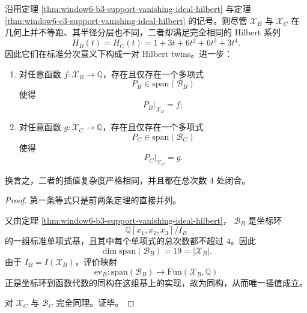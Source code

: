\begin{corollary}\label{cor:window6-b3c3-hilbert-twins-degree4-interpolation}
沿用定理 \ref{thm:window6-b3-support-vanishing-ideal-hilbert} 与定理 \ref{thm:window6-c3-support-vanishing-ideal-hilbert} 的记号。则尽管 \(\mathscr X_B\) 与 \(\mathscr X_C\) 在几何上并不等距、其半径分层也不同，二者却满足完全相同的 Hilbert 系列
\[
H_B(t)=H_C(t)=1+3t+6t^2+6t^3+3t^4.
\]
因此它们在标准分次意义下构成一对 Hilbert twins。进一步：
\begin{enumerate}
  \item 对任意函数 \(f:\mathscr X_B\to \mathbb Q\)，存在且仅存在一个多项式
  \[
  P_B\in \mathrm{span}(\mathcal B_B)
  \]
  使得
  \[
  P_B|_{\mathscr X_B}=f;
  \]
  \item 对任意函数 \(g:\mathscr X_C\to \mathbb Q\)，存在且仅存在一个多项式
  \[
  P_C\in \mathrm{span}(\mathcal B_C)
  \]
  使得
  \[
  P_C|_{\mathscr X_C}=g.
  \]
\end{enumerate}
换言之，二者的插值复杂度严格相同，并且都在总次数 \(4\) 处闭合。
\end{corollary}
\begin{proof}
第一条等式只是前两条定理的直接并列。

又由定理 \ref{thm:window6-b3-support-vanishing-ideal-hilbert}，
\(\mathcal B_B\) 是坐标环
\[
\mathbb Q[x_1,x_2,x_3]/I_B
\]
的一组标准单项式基，且其中每个单项式的总次数都不超过 \(4\)。因此
\[
\dim \mathrm{span}(\mathcal B_B)=19=|\mathscr X_B|.
\]
由于 \(I_B=I(\mathscr X_B)\)，评价映射
\[
\mathrm{ev}_B:\mathrm{span}(\mathcal B_B)\longrightarrow \mathrm{Fun}(\mathscr X_B,\mathbb Q)
\]
正是坐标环到函数代数的同构在这组基上的实现，故为同构，从而唯一插值成立。

对 \(\mathscr X_C\) 与 \(\mathcal B_C\) 完全同理。证毕。
\end{proof}

